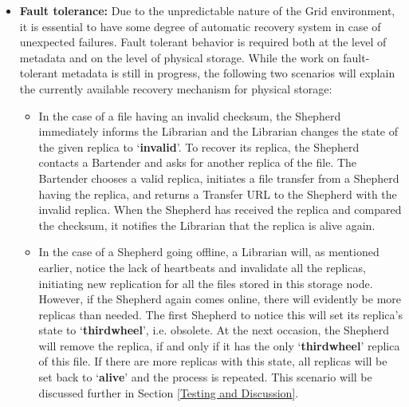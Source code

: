 \documentclass{llncs}
\begin{document}
\begin{itemize}

\item \textbf{Fault tolerance:} Due to the unpredictable nature of the Grid environment, it is essential to
have some degree of  automatic recovery system in case of unexpected
failures. Fault tolerant behavior is required both at the level of
metadata and on the level of physical storage. While the work on fault-tolerant metadata is still in
progress, the following two
scenarios will explain the currently available recovery mechanism for
physical storage: 
\begin{itemize}
\item In the case of a file having an invalid checksum, the Shepherd
immediately informs the Librarian and the Librarian changes the state of the given replica to
`\textbf{invalid}'. To recover its replica, the Shepherd contacts a
Bartender and asks for another replica of the file. The Bartender chooses a valid
replica, initiates a file transfer from a Shepherd having the replica,
and returns a Transfer URL to the Shepherd with the invalid replica. When the
Shepherd has received the replica and compared the checksum, it notifies the
Librarian that the replica is alive again.  
\item In the case of a Shepherd going offline, a Librarian will,
  as mentioned earlier, notice the lack of heartbeats and invalidate all the
  replicas, initiating new replication for all the files stored in
  this storage node. However, if the Shepherd
  again comes online, there will evidently be more replicas than
  needed. The first Shepherd to notice this will set its replica's
  state to `\textbf{thirdwheel}', i.e. obsolete. At the next occasion,
  the Shepherd will remove the replica, if and only if it has the only
  `\textbf{thirdwheel}' replica of this file. If there are more
  replicas with this state, all replicas will be set back to
  `\textbf{alive}' and the process is repeated. This scenario will be discussed further in Section
  \ref{Testing and Discussion}.
\end{itemize}



\end{itemize}
\end{document}

